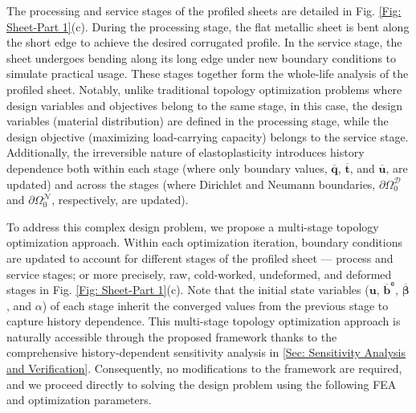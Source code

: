 \documentclass[preprint,11pt]{elsarticle}
\theoremstyle{definition}
\begin{document}
The processing and service stages of the profiled sheets are detailed in Fig. \ref{Fig: Sheet-Part 1}(c). During the processing stage, the flat metallic sheet is bent along the short edge to achieve the desired corrugated profile. In the service stage, the sheet undergoes bending along its long edge under new boundary conditions to simulate practical usage. These stages together form the whole-life analysis of the profiled sheet. Notably, unlike traditional topology optimization problems where design variables and objectives belong to the same stage, in this case, the design variables (material distribution) are defined in the processing stage, while the design objective (maximizing load-carrying capacity) belongs to the service stage. Additionally, the irreversible nature of elastoplasticity introduces history dependence both within each stage (where only boundary values, $\overline{\mathbf{q}}$, $\overline{\mathbf{t}}$, and $\overline{\mathbf{u}}$, are updated) and across the stages (where Dirichlet and Neumann boundaries, $\partial \Omega_0^\mathcal{D}$ and $\partial \Omega_0^\mathcal{N}$, respectively, are updated).

To address this complex design problem, we propose a multi-stage topology optimization approach. Within each optimization iteration, boundary conditions are updated to account for different stages of the profiled sheet --- process and service stages; or more precisely, raw, cold-worked, undeformed, and deformed stages in Fig. \ref{Fig: Sheet-Part 1}(c). Note that the initial state variables ($\mathbf{u}$, $\overline{\mathbf{b}}^\texttt{e}$, $\overline{\boldsymbol{\beta}}$, and $\alpha$) of each stage inherit the converged values from the previous stage to capture history dependence. This multi-stage topology optimization approach is naturally accessible through the proposed framework thanks to the comprehensive history-dependent sensitivity analysis in \ref{Sec: Sensitivity Analysis and Verification}. Consequently, no modifications to the framework are required, and we proceed directly to solving the design problem using the following FEA and optimization parameters.
\end{document}

